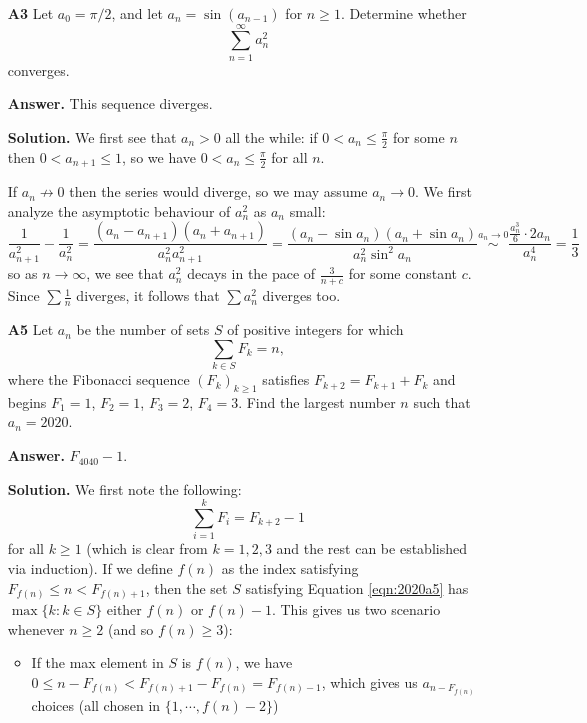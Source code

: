 \documentclass[11pt,a4paper]{article}
\newcommand{\<}{\langle}
\renewcommand{\>}{\rangle}
\begin{document}
\begin{enumerate}
    \item [\textbf{A3}] 
    Let $a_0=\pi /2$, and let $a_n=\sin (a_{n-1})$ for $n\ge 1$. Determine whether
    \[ \sum_{n=1}^{\infty}a_n^2 \]converges.
    
    \textbf{Answer.} This sequence diverges. 
    
    \textbf{Solution.} We first see that $a_n>0$ all the while: if $0<a_n\le \frac{\pi}{2}$ for some $n$ then $0 < a_{n+1}\le 1$, 
    so we have $0<a_n\le \frac{\pi}{2}$ for all $n$. 
    
    If $a_n\not\to 0$ then the series would diverge, so we may assume $a_n\to 0$. 
    We first analyze the asymptotic behaviour of $a_n^2$ as $a_n$ small: 
    \[
    \frac{1}{a_{n+1}^2}-\frac{1}{a_n^2}
    =\frac{(a_n-a_{n+1})(a_n+a_{n+1})}{a_n^2a_{n+1}^2}
    =\frac{(a_n-\sin a_n)(a_n+\sin a_n)}{a_n^2\sin^2 a_n}
    \stackrel{a_n\to 0}{\sim} \frac{\frac{a_n^3}{6}\cdot 2a_n}{a_n^4}
    =\frac 13
    \]
    so as $n\to\infty$, we see that $a_n^2$ decays in the pace of $\frac{3}{n+c}$ for some constant $c$. 
    Since $\sum \frac{1}{n}$ diverges, it follows that $\sum a_n^2$ diverges too. 
	
	\item [\textbf{A5}] 
	Let $a_n$ be the number of sets $S$ of positive integers for which
	\begin{equation}\label{eqn:2020a5}
	  \sum_{k\in S}F_k=n,
	\end{equation}
	where the Fibonacci sequence $(F_k)_{k\ge 1}$ satisfies $F_{k+2}=F_{k+1}+F_k$ and begins $F_1=1$, $F_2=1$, $F_3=2$, $F_4=3$. Find the largest number $n$ such that $a_n=2020$.
	
	\textbf{Answer.} $F_{4040}-1$. 
	
	\textbf{Solution.} 
	We first note the following: 
	\begin{equation}\label{eqn:2020a5sum}
	\sum_{i=1}^k F_i = F_{k+2}-1
	\end{equation}
	for all $k\ge 1$ (which is clear from $k=1,2,3$ and the rest can be established via induction). 
	If we define $f(n)$ as the index satisfying $F_{f(n)}\le n < F_{f(n)+1}$, 
	then the set $S$ satisfying Equation \ref{eqn:2020a5} has $\max \{k: k\in S\}$ either $f(n)$ or $f(n)-1$. 
	This gives us two scenario whenever $n\ge 2$ (and so $f(n)\ge 3$): 
	\begin{itemize}
		\item If the max element in $S$ is $f(n)$, we have $0\le n - F_{f(n)} < F_{f(n)+1} - F_{f(n)} = F_{f(n)-1}$, 
		which gives us $a_{n-F_{f(n)}}$ choices (all chosen in $\{1, \cdots, f(n)-2\}$)
		

\end{itemize}
\end{enumerate}
\end{document}
